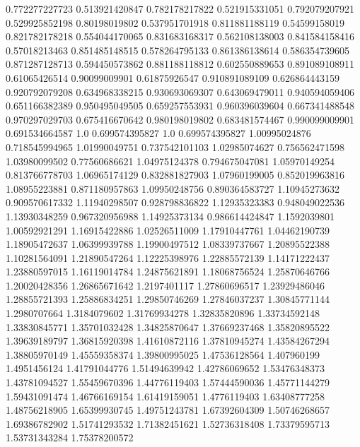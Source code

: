  0.772277227723   0.513921420847
 0.782178217822   0.521915331051
 0.792079207921   0.529925852198
  0.80198019802   0.537951701918
 0.811881188119    0.54599158019
 0.821782178218   0.554044170065
 0.831683168317   0.562108138003
 0.841584158416    0.57018213463
 0.851485148515   0.578264795133
 0.861386138614   0.586354739605
 0.871287128713   0.594450573862
 0.881188118812   0.602550889653
 0.891089108911    0.61065426514
  0.90099009901    0.61875926547
 0.910891089109   0.626864443159
 0.920792079208   0.634968338215
 0.930693069307   0.643069479011
 0.940594059406   0.651166382389
 0.950495049505   0.659257553931
 0.960396039604   0.667341488548
 0.970297029703   0.675416670642
 0.980198019802   0.683481574467
 0.990099009901   0.691534664587
            1.0   0.699574395827
            1.0   0.699574395827
  1.00995024876   0.718545994965
  1.01990049751   0.737542101103
  1.02985074627   0.756562471598
  1.03980099502    0.77560686621
  1.04975124378   0.794675047081
  1.05970149254   0.813766778703
  1.06965174129   0.832881827903
  1.07960199005   0.852019963816
  1.08955223881   0.871180957863
  1.09950248756   0.890364583727
  1.10945273632   0.909570617332
  1.11940298507   0.928798836822
  1.12935323383   0.948049022536
  1.13930348259   0.967320956988
  1.14925373134   0.986614424847
   1.1592039801    1.00592921291
  1.16915422886    1.02526511009
  1.17910447761    1.04462190739
  1.18905472637    1.06399939788
  1.19900497512    1.08339737667
  1.20895522388    1.10281564091
  1.21890547264    1.12225398976
  1.22885572139    1.14171222437
  1.23880597015    1.16119014784
  1.24875621891    1.18068756524
  1.25870646766    1.20020428356
  1.26865671642     1.2197401117
  1.27860696517    1.23929486046
  1.28855721393    1.25886834251
  1.29850746269    1.27846037237
  1.30845771144     1.2980707664
   1.3184079602    1.31769934278
  1.32835820896    1.33734592148
  1.33830845771    1.35701032428
  1.34825870647    1.37669237468
  1.35820895522    1.39639189797
  1.36815920398    1.41610872116
  1.37810945274    1.43584267294
  1.38805970149    1.45559358374
  1.39800995025    1.47536128564
    1.407960199     1.4951456124
  1.41791044776    1.51494639942
  1.42786069652    1.53476348373
  1.43781094527    1.55459670396
  1.44776119403    1.57444590036
  1.45771144279    1.59431091474
  1.46766169154    1.61419159051
   1.4776119403    1.63408777258
  1.48756218905    1.65399930745
  1.49751243781    1.67392604309
  1.50746268657    1.69386782902
  1.51741293532    1.71382451621
  1.52736318408    1.73379595713
  1.53731343284    1.75378200572

